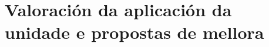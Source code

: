 







\section{Valoración da aplicación da unidade e propostas de mellora}\label{sec:aplicacion}

